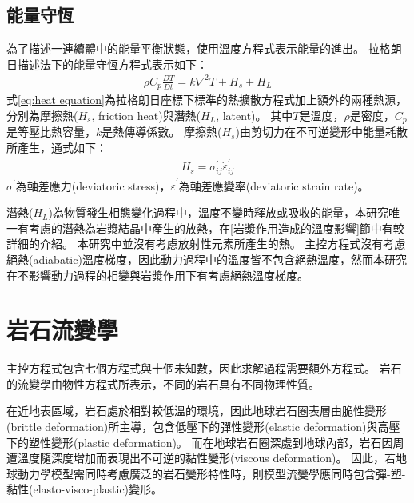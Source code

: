 \subsection{能量守恆}
為了描述一連續體中的能量平衡狀態，使用溫度方程式表示能量的進出。
拉格朗日描述法下的能量守恆方程式表示如下：
\begin{align}
\rho C_p \frac{DT}{Dt} = k\nabla^2T+H_s+H_L
\label{eq:heat equation}
\end{align}
式\ref{eq:heat equation}為拉格朗日座標下標準的熱擴散方程式加上額外的兩種熱源，分別為摩擦熱($H_s$, friction heat)與潛熱($H_L$, latent)。
其中$T$是溫度，$\rho$是密度，$C_p$是等壓比熱容量，$k$是熱傳導係數。
摩擦熱($H_s$)由剪切力在不可逆變形中能量耗散所產生，通式如下：
\begin{align}
    H_s = \sigma^{'}_{ij}\dot\varepsilon^{'}_{ij}
\end{align}
$\sigma^{'}$為軸差應力(deviatoric stress)，$\dot\varepsilon^{'}$為軸差應變率(deviatoric strain rate)。

潛熱($H_L$)為物質發生相態變化過程中，溫度不變時釋放或吸收的能量，本研究唯一有考慮的潛熱為岩漿結晶中產生的放熱，在\ref{岩漿作用造成的溫度影響}節中有較詳細的介紹。
本研究中並沒有考慮放射性元素所產生的熱。
主控方程式沒有考慮絕熱(adiabatic)溫度梯度，因此動力過程中的溫度皆不包含絕熱溫度，然而本研究在不影響動力過程的相變與岩漿作用下有考慮絕熱溫度梯度。

\section{岩石流變學}
主控方程式包含七個方程式與十個未知數，因此求解過程需要額外方程式。
岩石的流變學由物性方程式所表示，不同的岩石具有不同物理性質。

在近地表區域，岩石處於相對較低溫的環境，因此地球岩石圈表層由脆性變形(brittle deformation)所主導，包含低壓下的彈性變形(elastic deformation)與高壓下的塑性變形(plastic deformation)。
而在地球岩石圈深處到地球內部，岩石因周遭溫度隨深度增加而表現出不可逆的黏性變形(viscous deformation)。
因此，若地球動力學模型需同時考慮廣泛的岩石變形特性時，則模型流變學應同時包含彈-塑-黏性(elasto-visco-plastic)變形。

